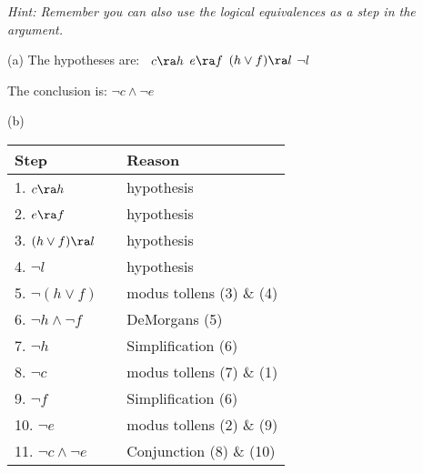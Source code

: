 \begin{questions}

\textit{Hint: Remember you can also use the logical equivalences as a step in the argument.}
    \ifprintanswers
        \vspace{-2pt}
    \fi
\begin{solution}
  (a) The hypotheses are:  $\;\;c \ra h$ \qquad $e \ra f$ \qquad $(h \vee f) \ra l$ 
  \qquad $\neg l$ 

  The conclusion is: $\neg c \wedge \neg e$
  
  (b) 

  \begin{tabular}{lll}
        Step    & \hspace{0.2in} & Reason \\
        \hline
        1. $c \ra h$                & & hypothesis \\
        2. $e \ra f$           & & hypothesis \\
        3. $(h \vee f) \ra l$            & & hypothesis \\
        4. $\neg l$ 				& & hypothesis \\
        5. $\neg (h \vee f)$   & & modus tollens (3) \& (4) \\
        6. $\neg h \wedge \neg f$       & & DeMorgans (5) \\
        7. $\neg h$               & & Simplification (6) \\
        8. $\neg c$          & & modus tollens (7) \& (1) \\
        9. $\neg f$       & & Simplification (6) \\
        10. $\neg e$  		& & modus tollens (2) \& (9) \\
        11. $\neg c \wedge \neg e$ 		 & & Conjunction (8) \& (10) \\
    \end{tabular}
    

\end{solution}
\end{questions}

